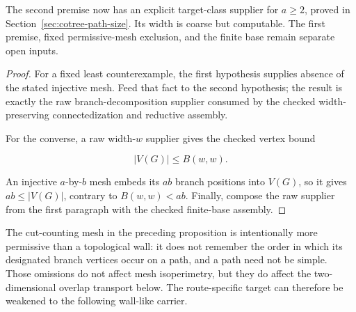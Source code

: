 The second premise now has an explicit target-class supplier for
$a\geq2$, proved in Section~\ref{sec:cotree-path-size}.  Its width is
coarse but computable.  The first premise, fixed permissive-mesh exclusion,
and the finite base remain separate open inputs.

\begin{proof}
For a fixed least counterexample, the first hypothesis supplies absence of
the stated injective mesh.  Feed that fact to the second hypothesis; the
result is exactly the raw branch-decomposition supplier consumed by the
checked width-preserving connectedization and reductive assembly.

For the converse, a raw width-$w$ supplier gives the checked vertex bound

\[
                         |V(G)|\le B(w,w).
\]

An injective $a$-by-$b$ mesh embeds its $ab$ branch positions into
$V(G)$, so it gives $ab\le |V(G)|$, contrary to $B(w,w)<ab$.
Finally, compose the raw supplier from the first paragraph with the checked
finite-base assembly.
\end{proof}

The cut-counting mesh in the preceding proposition is intentionally more
permissive than a topological wall: it does not remember the order in which
its designated branch vertices occur on a path, and a path need not be
simple.  Those omissions do not affect mesh isoperimetry, but they do affect
the two-dimensional overlap transport below.  The route-specific target can
therefore be weakened to the following wall-like carrier.

